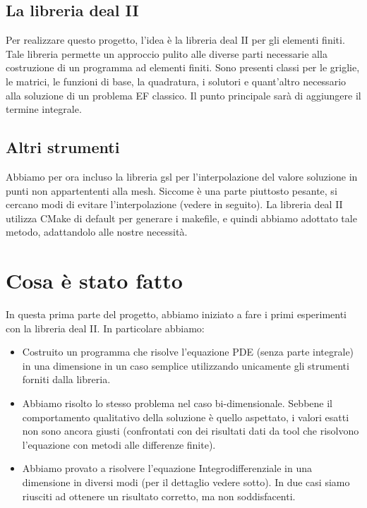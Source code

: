 \documentclass[a4paper,10pt]{article}
\begin{document}
\subsection{La libreria deal II}

Per realizzare questo progetto, l'idea è la libreria deal II per gli elementi finiti. Tale libreria permette un approccio pulito alle diverse parti necessarie alla costruzione di un programma ad elementi finiti. Sono presenti classi per le griglie, le matrici, le funzioni di base, la quadratura, i solutori e quant'altro necessario alla soluzione di un problema EF classico. Il punto principale sarà di aggiungere il termine integrale.

\subsection{Altri strumenti}

Abbiamo per ora incluso la libreria gsl per l'interpolazione del valore soluzione in punti non appartententi alla mesh. Siccome è una parte piuttosto pesante, si cercano modi di evitare l'interpolazione (vedere in seguito). La libreria deal II utilizza CMake di default per generare i makefile, e quindi abbiamo adottato tale metodo, adattandolo alle nostre necessità.

\section{Cosa è stato fatto}

In questa prima parte del progetto, abbiamo iniziato a fare i primi esperimenti con la libreria deal II. In particolare abbiamo:

\begin{itemize}
 \item Costruito un programma che risolve l'equazione PDE  (senza parte integrale) in una dimensione in un caso semplice utilizzando unicamente gli strumenti forniti dalla libreria.
 \item Abbiamo risolto lo stesso problema nel caso bi-dimensionale. Sebbene il comportamento qualitativo della soluzione è quello aspettato, i valori esatti non sono ancora giusti (confrontati con dei risultati dati da tool che risolvono l'equazione con metodi alle differenze finite).
 \item Abbiamo provato a risolvere l'equazione Integrodifferenziale in una dimensione in diversi modi (per il dettaglio vedere sotto). In due casi siamo riusciti ad ottenere un risultato corretto, ma non soddisfacenti.
\end{itemize}
\end{document}
